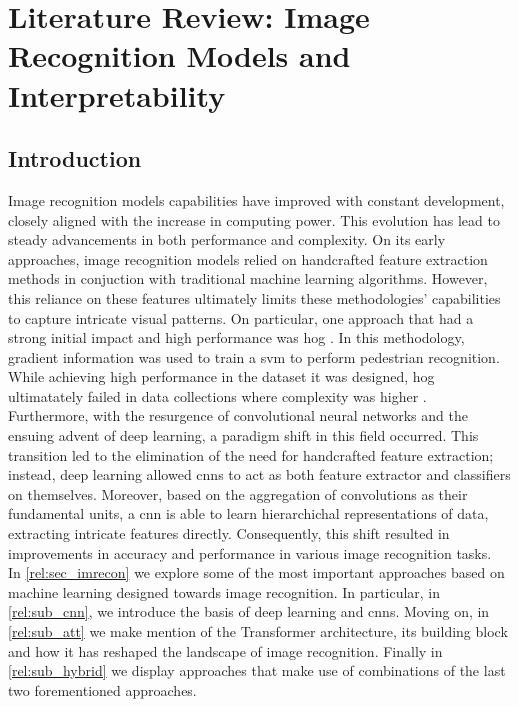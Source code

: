 \chapter{Literature Review: Image Recognition Models and Interpretability}
\label{ch:rel}
\chaptertoc{}
\section{Introduction}
Image recognition models capabilities have improved with constant development, 
closely aligned with the increase in computing power. This evolution has lead to steady 
advancements in both performance and complexity. On its early approaches, image recognition models 
relied on handcrafted feature extraction methods  in conjuction with traditional machine learning 
algorithms. However, this reliance on these features ultimately limits these methodologies' 
capabilities to capture intricate visual patterns.
On particular, one approach that had a strong initial impact and high performance was \gls{hog} 
\autocite{dalal2005histograms}. In this methodology, gradient information was used to train a 
\gls{svm} to perform pedestrian recognition. While achieving high performance in the dataset it was 
designed, \gls{hog} ultimatately failed in data collections where complexity was higher 
\autocite{5975165}.\\
Furthermore, with the resurgence of convolutional neural networks and the ensuing advent of 
deep learning, a paradigm shift in this field occurred. This transition led to the elimination of 
the need for handcrafted feature extraction; instead, deep learning allowed \glspl{cnn} to act 
as both feature extractor and classifiers on themselves. Moreover, based on the aggregation of 
convolutions as their fundamental units, a \gls{cnn} is able to learn hierarchichal 
representations of data, extracting intricate features directly. 
Consequently, this shift resulted in improvements in accuracy and performance in various image 
recognition tasks. \\

\noindent In \autoref{rel:sec_imrecon} we explore some of the most important approaches based 
on machine learning designed towards image recognition. In particular, in \autoref{rel:sub_cnn}, we 
introduce the basis of deep learning and \glspl{cnn}. Moving on, in \autoref{rel:sub_att} we make 
mention of the Transformer architecture, its building block and how it has reshaped the landscape 
of image recognition. Finally in \autoref{rel:sub_hybrid} we display approaches that make use of 
combinations of the last two forementioned approaches.\\


